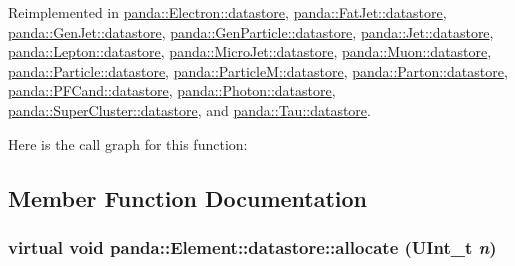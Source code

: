 Reimplemented in \hyperlink{structpanda_1_1Electron_1_1datastore_af9dfc2f8a0fca924c40cc0d488f6bb02}{panda::Electron::datastore}, \hyperlink{structpanda_1_1FatJet_1_1datastore_ab30c9e78310606976935325a55cb10e6}{panda::FatJet::datastore}, \hyperlink{structpanda_1_1GenJet_1_1datastore_aee5add4c9f162350865cec47c322dec0}{panda::GenJet::datastore}, \hyperlink{structpanda_1_1GenParticle_1_1datastore_af04b1b2c05d433c8020d5250db10d7d9}{panda::GenParticle::datastore}, \hyperlink{structpanda_1_1Jet_1_1datastore_a70fb643b535f39f676287fe34d603e01}{panda::Jet::datastore}, \hyperlink{structpanda_1_1Lepton_1_1datastore_aded63fdccd7551ae16f99adbd29afb82}{panda::Lepton::datastore}, \hyperlink{structpanda_1_1MicroJet_1_1datastore_a35979d6037e5229b018a32e3d0700360}{panda::MicroJet::datastore}, \hyperlink{structpanda_1_1Muon_1_1datastore_a399cd7ed5610fc6c99ac1d3365ddc354}{panda::Muon::datastore}, \hyperlink{structpanda_1_1Particle_1_1datastore_afb2d9f4926afbfa8e0f15f0d8d98094a}{panda::Particle::datastore}, \hyperlink{structpanda_1_1ParticleM_1_1datastore_ae068980c20730bc8565d2f7ea701bc5e}{panda::ParticleM::datastore}, \hyperlink{structpanda_1_1Parton_1_1datastore_aa1e55feb33f97040c324d9ba93126dba}{panda::Parton::datastore}, \hyperlink{structpanda_1_1PFCand_1_1datastore_af62f03093f0dd1177468df953265e198}{panda::PFCand::datastore}, \hyperlink{structpanda_1_1Photon_1_1datastore_a7282a7c7cc04a9350041a59e9ecba5b5}{panda::Photon::datastore}, \hyperlink{structpanda_1_1SuperCluster_1_1datastore_ad47081958ab7831bd7d6656e0655bbfd}{panda::SuperCluster::datastore}, and \hyperlink{structpanda_1_1Tau_1_1datastore_a1cacb9f88f221d242a5e80ba7959c27b}{panda::Tau::datastore}.

Here is the call graph for this function:

\subsection{Member Function Documentation}
\hypertarget{structpanda_1_1Element_1_1datastore_a0397350c92ee5cbf2d16cf66fc701afa}{
\subsubsection[{allocate}]{\setlength{\rightskip}{0pt plus 5cm}virtual void panda::Element::datastore::allocate (UInt\_\-t {\em n})}}
\label{structpanda_1_1Element_1_1datastore_a0397350c92ee5cbf2d16cf66fc701afa}


